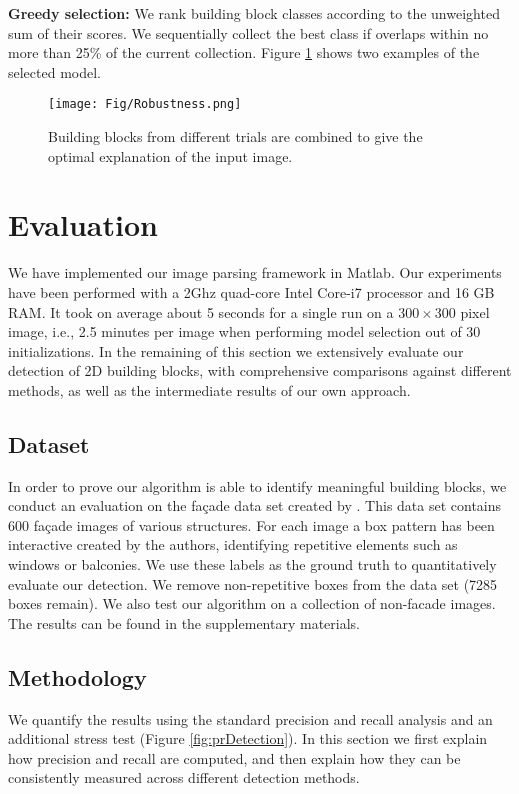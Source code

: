 \documentclass{acmtog}
\begin{document}
\textbf{Greedy selection:} We rank building block classes according to the unweighted sum of their scores. We sequentially collect the best class if overlaps within no more than 25\% of the current collection. Figure \ref{fig:Rob} shows two examples of the selected model.


\begin{figure}[t!]
  \centering
  \texttt{[image: Fig/Robustness.png]}
  \caption{Building blocks from different trials are combined to give the optimal explanation of the input image.} \label{fig:Rob}
\end{figure}

\section{Evaluation}
\label{sec:Evaluation}

We have implemented our image parsing framework in Matlab. Our experiments have been performed with a 2Ghz quad-core Intel Core-i7 processor and 16 GB RAM. It took on average about 5 seconds for a single run on a $300 \times 300$ pixel image, i.e., 2.5 minutes per image when performing model selection out of 30 initializations. In the remaining of this section we extensively evaluate our detection of 2D building blocks, with comprehensive comparisons against different methods, as well as the intermediate results of our own approach.

\subsection{Dataset}
In order to prove our algorithm is able to identify meaningful building blocks, we conduct an evaluation on the fa{\c{c}}ade data set created by \cite{ZHANGsig13}. This data set contains 600 fa{\c{c}}ade images of various structures. For each image a box pattern has been interactive created by the authors, identifying repetitive elements such as windows or balconies. We use these labels as the ground truth to quantitatively evaluate our detection. We remove non-repetitive boxes from the data set (7285 boxes remain). We also test our algorithm on a collection of non-facade images. The results can be found in the supplementary materials.

\subsection{Methodology}
We quantify the results using the standard precision and recall analysis and an additional stress test (Figure \ref{fig:prDetection}). In this section we first explain how precision and recall are computed, and then explain how they can be consistently measured across different detection methods. 
\end{document}
